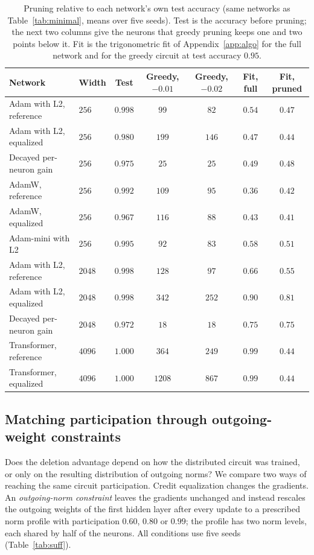 \documentclass{article} %
\begin{document}
\begin{table}[!ht]
\caption{Pruning relative to each network's own test accuracy (same networks as Table~\ref{tab:minimal}, means over five seeds). Test is the accuracy before pruning; the next two columns give the neurons that greedy pruning keeps one and two points below it. Fit is the trigonometric fit of Appendix~\ref{app:algo} for the full network and for the greedy circuit at test accuracy $0.95$.}
\label{tab:minimalcheck}
\begin{center}
\footnotesize
\setlength{\tabcolsep}{4pt}
\begin{tabular}{llccccc}
\toprule
Network & Width & Test & Greedy, $-0.01$ & Greedy, $-0.02$ & Fit, full & Fit, pruned \\
\midrule
Adam with L2, reference & $256$ & $0.998$ & $99$ & $82$ & $0.54$ & $0.47$ \\
Adam with L2, equalized & $256$ & $0.980$ & $199$ & $146$ & $0.47$ & $0.44$ \\
Decayed per-neuron gain & $256$ & $0.975$ & $25$ & $25$ & $0.49$ & $0.48$ \\
AdamW, reference & $256$ & $0.992$ & $109$ & $95$ & $0.36$ & $0.42$ \\
AdamW, equalized & $256$ & $0.967$ & $116$ & $88$ & $0.43$ & $0.41$ \\
Adam-mini with L2 & $256$ & $0.995$ & $92$ & $83$ & $0.58$ & $0.51$ \\
\midrule
Adam with L2, reference & $2048$ & $0.998$ & $128$ & $97$ & $0.66$ & $0.55$ \\
Adam with L2, equalized & $2048$ & $0.998$ & $342$ & $252$ & $0.90$ & $0.81$ \\
Decayed per-neuron gain & $2048$ & $0.972$ & $18$ & $18$ & $0.75$ & $0.75$ \\
\midrule
Transformer, reference & $4096$ & $1.000$ & $364$ & $249$ & $0.99$ & $0.44$ \\
Transformer, equalized & $4096$ & $1.000$ & $1208$ & $867$ & $0.99$ & $0.44$ \\
\bottomrule
\end{tabular}
\end{center}
\end{table}

\subsection{Matching participation through outgoing-weight constraints}
\label{app:suff}
Does the deletion advantage depend on how the distributed circuit was trained, or only on the resulting distribution of outgoing norms? We compare two ways of reaching the same circuit participation. Credit equalization changes the gradients. An \emph{outgoing-norm constraint} leaves the gradients unchanged and instead rescales the outgoing weights of the first hidden layer after every update to a prescribed norm profile with participation $0.60$, $0.80$ or $0.99$; the profile has two norm levels, each shared by half of the neurons. All conditions use five seeds (Table~\ref{tab:suff}).
\end{document}

